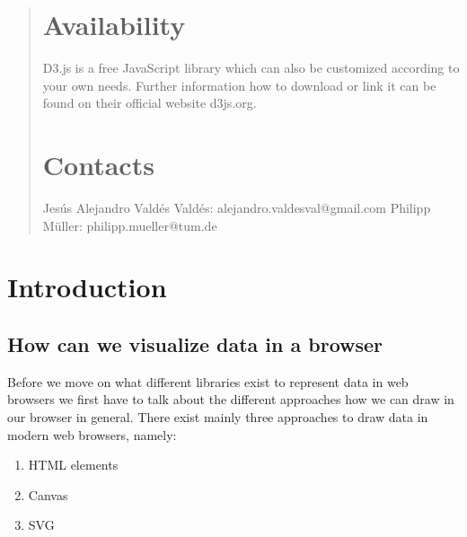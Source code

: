 \documentclass{bioinfo}
\begin{document}
\begin{abstract}
\section{Availability}
\newline
D3.js is a free JavaScript library which can also be customized according to your own needs. Further information how to download or link it can be found on their official website d3js.org.

\section{Contacts}
\newline
Jes\'us Alejandro Vald\'es Vald\'es: alejandro.valdesval@gmail.com \newline
Philipp M\"uller: philipp.mueller@tum.de
\end{abstract}

\section{Introduction}
\subsection{How can we visualize data in a browser}
Before we move on what different libraries exist to represent data in web browsers we first have to talk about the different approaches how we can draw in our browser in general.
There exist mainly three approaches to draw data in modern web browsers, namely:
\begin{enumerate}
\item HTML elements
\item Canvas
\item SVG
\end{enumerate}
\end{document}
